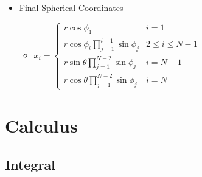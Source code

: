 \begin{itemize}
\begin{itemize}
\begin{itemize}
		$\Rightarrow$ define $\theta \in [0,2\pi)$ instead of $\phi_{N-1}, \phi_N\in[0,\pi]$ \\
		$\displaystyle \Rightarrow x_{N-1} = r_{N-1}\sin\theta, x_{N} = r_{N-1}\cos\theta$ (interchangeable)
		\end{itemize}
	\item Final Spherical Coordinates
		\begin{itemize}
		\item $x_i = \begin{cases} r\cos\phi_1 & i = 1 \\ \displaystyle r\cos\phi_i\prod_{j=1}^{i-1}\sin\phi_j & 2\le i \le N-1 \\ \displaystyle r\sin\theta\prod_{j=1}^{N-2}\sin\phi_j & i=N-1 \\ \displaystyle r\cos\theta\prod_{j=1}^{N-2}\sin\phi_j & i=N \end{cases}$
		\end{itemize}
	\end{itemize}

\end{itemize}

 
\section{Calculus}

\subsection{Integral}
